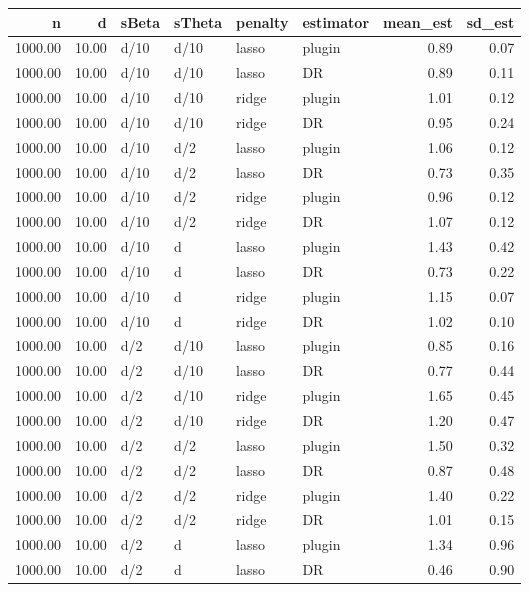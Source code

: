 \begin{table}[ht]
\centering
\begin{tabular}{rrllllrr}
  \hline
n & d & sBeta & sTheta & penalty & estimator & mean\_est & sd\_est \\ 
  \hline
1000.00 & 10.00 & d/10 & d/10 & lasso & plugin & 0.89 & 0.07 \\ 
  1000.00 & 10.00 & d/10 & d/10 & lasso & DR & 0.89 & 0.11 \\ 
  1000.00 & 10.00 & d/10 & d/10 & ridge & plugin & 1.01 & 0.12 \\ 
  1000.00 & 10.00 & d/10 & d/10 & ridge & DR & 0.95 & 0.24 \\ 
  1000.00 & 10.00 & d/10 & d/2 & lasso & plugin & 1.06 & 0.12 \\ 
  1000.00 & 10.00 & d/10 & d/2 & lasso & DR & 0.73 & 0.35 \\ 
  1000.00 & 10.00 & d/10 & d/2 & ridge & plugin & 0.96 & 0.12 \\ 
  1000.00 & 10.00 & d/10 & d/2 & ridge & DR & 1.07 & 0.12 \\ 
  1000.00 & 10.00 & d/10 & d & lasso & plugin & 1.43 & 0.42 \\ 
  1000.00 & 10.00 & d/10 & d & lasso & DR & 0.73 & 0.22 \\ 
  1000.00 & 10.00 & d/10 & d & ridge & plugin & 1.15 & 0.07 \\ 
  1000.00 & 10.00 & d/10 & d & ridge & DR & 1.02 & 0.10 \\ 
  1000.00 & 10.00 & d/2 & d/10 & lasso & plugin & 0.85 & 0.16 \\ 
  1000.00 & 10.00 & d/2 & d/10 & lasso & DR & 0.77 & 0.44 \\ 
  1000.00 & 10.00 & d/2 & d/10 & ridge & plugin & 1.65 & 0.45 \\ 
  1000.00 & 10.00 & d/2 & d/10 & ridge & DR & 1.20 & 0.47 \\ 
  1000.00 & 10.00 & d/2 & d/2 & lasso & plugin & 1.50 & 0.32 \\ 
  1000.00 & 10.00 & d/2 & d/2 & lasso & DR & 0.87 & 0.48 \\ 
  1000.00 & 10.00 & d/2 & d/2 & ridge & plugin & 1.40 & 0.22 \\ 
  1000.00 & 10.00 & d/2 & d/2 & ridge & DR & 1.01 & 0.15 \\ 
  1000.00 & 10.00 & d/2 & d & lasso & plugin & 1.34 & 0.96 \\ 
  1000.00 & 10.00 & d/2 & d & lasso & DR & 0.46 & 0.90 \\ 

\end{tabular}
\end{table}
